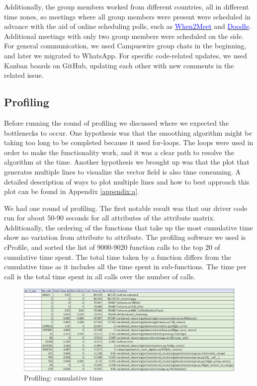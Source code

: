 \documentclass[11pt]{article}
\begin{document}
Additionally, the group members worked from different countries, all in different time zones, so meetings where all group members were present were scheduled in advance with the aid of online scheduling polls, such as \href{https://www.when2meet.com/}{\textcolor{blue}{When2Meet}} and \href{https://doodle.com/en/}{\textcolor{blue}{Doodle}}. Additional meetings with only two group members were scheduled on the side. For general communication, we used Campuswire group chats in the beginning, and later we migrated to WhatsApp. For specific code-related updates, we used Kanban boards on GitHub, updating each other with new comments in the related issue.

\subsection{Profiling}
Before running the round of profiling we discussed where we expected the bottlenecks to occur. One hypothesis was that the smoothing algorithm might be taking too long to be completed because it used for-loops. The loops were used in order to make the functionality work, and it was a clear path to resolve the algorithm at the time. Another hypothesis we brought up was that the plot that generates multiple lines to visualize the vector field is also time consuming. A detailed description of ways to plot multiple lines and how to best approach this plot can be found in Appendix \ref{appendix:a}.

We had one round of profiling. The first notable result was that our driver code run for about 50-90 seconds for all attributes of the attribute matrix. Additionally, the ordering of the functions that take up the most cumulative time show no variation from attribute to attribute. The profiling software we used is cProfile, and sorted the list of 9000-9020 function calls to the top 20 of cumulative time spent. The total time taken by a function differs from the cumulative time as it includes all the time spent in sub-functions. The time per call is the total time spent in all calls over the number of calls.

\begin{figure}[H]
    \centering
    \includegraphics[scale=0.65]{Profiling.JPG}
	\caption{Profiling: cumulative time}
	\label{fig:uml}
\end{figure}
\end{document}
